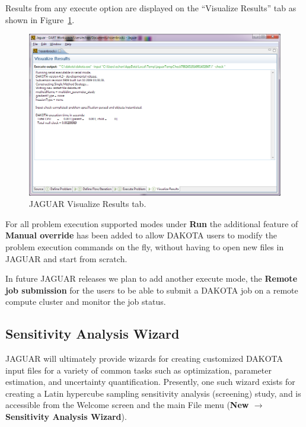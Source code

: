 Results from any execute option are displayed on the ``Visualize
Results'' tab as shown in Figure~\ref{fig:input:jaguar_visualize}.

\begin{figure}[htbp]
  \centering
  \includegraphics[scale=0.6]{images/5Visualize}
  \caption{JAGUAR Visualize Results tab.}
  \label{fig:input:jaguar_visualize}
\end{figure}


For all problem execution supported modes under {\bf Run} the additional feature of 
{\bf Manual override} has been added to allow DAKOTA users to modify the problem execution 
commands on the fly, without having to open new files in JAGUAR and start from scratch. 

In future JAGUAR releases we plan to add another execute mode, the {\bf Remote job submission} for the users to be able to submit a DAKOTA job on a remote
compute cluster and monitor the job status.


\subsection{Sensitivity Analysis Wizard}

JAGUAR will ultimately provide wizards for creating customized DAKOTA
input files for a variety of common tasks such as optimization,
parameter estimation, and uncertainty quantification.  Presently, one
such wizard exists for creating a Latin hypercube sampling sensitivity
analysis (screening) study, and is accessible from the Welcome screen
and the main File menu ({\bf New $\rightarrow$ Sensitivity Analysis
Wizard}).

